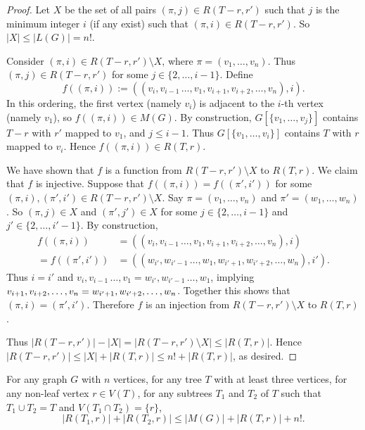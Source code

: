 \documentclass[a4paper,11pt]{article}
\renewcommand{\leq}{\leqslant}
\begin{document}
\begin{proof}
Let $X$ be the set of all pairs $(\pi,j)\in R(T-r,r')$ such that $j$ is the minimum integer $i$ (if any exist) such that  $(\pi,i)\in R(T-r,r')$. 
So $|X|\leq |L(G)|=n!$. 

Consider $(\pi,i)  \in R(T-r,r')\setminus X$, where $\pi = (v_1,\dots,v_n)$. 
Thus $(\pi,j)\in R(T-r,r')$ for some $j\in\{2,\dots,i-1\}$. 
Define 
\[f((\pi,i)) := (( v_i,v_{i-1}\,\dots,v_1,v_{i+1},v_{i+2},\dots,v_n),i).\]
In this ordering, the first vertex (namely $v_i$) is adjacent to the $i$-th vertex (namely $v_1$), so $f((\pi,i)) \in M(G)$. 
By construction, $G[\{v_1,\dots,v_j\}]$ contains $T-r$ with $r'$ mapped to $v_1$, and $j\leq i-1$. 
Thus $G[\{v_1,\dots,v_i\}]$ contains $T$ with $r$ mapped to $v_i$. 
Hence $f((\pi,i))\in R(T,r)$. 

We have shown that  $f$ is a function from $R(T-r,r')\setminus X$ to $R(T,r)$. 
We claim that $f$ is injective. 
Suppose that $f((\pi,i))=f((\pi',i'))$ for some $(\pi,i),(\pi',i')\in R(T-r,r')\setminus X$. 
Say $\pi=(v_1,\dots,v_n)$ and $\pi'=(w_1,\dots,w_n)$. 
So $(\pi,j) \in X$ and $ (\pi',j') \in X$ for some $j\in\{2,\dots,i-1\}$ and $j'\in\{2,\dots,i'-1\}$. 
By construction,
\begin{align*}
f((\pi,i)) & = (( v_i,v_{i-1}\,\dots,v_1,v_{i+1},v_{i+2},\dots,v_n),i)\\
= f((\pi',i')) & = (( w_{i'},w_{i'-1}\,\dots,w_1,w_{i'+1},w_{i'+2},\dots,w_n),i').
\end{align*}
Thus $i=i'$ and 
$v_i,v_{i-1}\,\dots,v_1=w_{i'},w_{i'-1}\,\dots,w_1$, implying
$v_{i+1},v_{i+2},\dots,v_n=\linebreak w_{i'+1},w_{i'+2},\dots,w_n$.
Together this shows that $(\pi,i) = (\pi',i')$. 
Therefore $f$ is an injection from $R(T-r,r')\setminus X$ to $R(T,r)$. 

Thus $|R(T-r,r')| - |X|=|R(T-r,r')\setminus X| \leq |R(T,r)|$. 
Hence $|R(T-r,r')|  \leq |X| + |R(T,r)| \leq n! + |R(T,r)|$, as desired. 
\end{proof}

\begin{lem}
\label{NonLeaf}
For any graph $G$ with $n$ vertices, for any tree $T$ with at least three vertices, for any non-leaf vertex $r\in V(T)$, for any subtrees $T_1$ and $T_2$ of $T$ such that $T_1\cup T_2=T$ and $V(T_1\cap T_2)=\{r\}$, 
\[ |R(T_1,r)| + |R(T_2,r)| \leq |M(G)| + |R(T,r)| + n!. \]
\end{lem}
\end{document}
